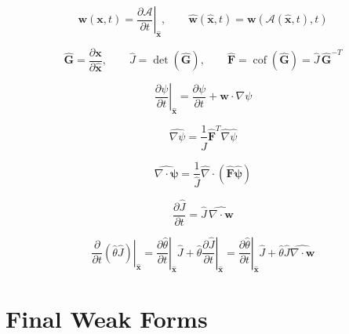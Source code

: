 \documentclass[11pt]{article}
\begin{document}
\begin{equation}
    \mathbf{w}(\mathbf{x},t) = \left.\frac{\partial \mathcal{A}}{\partial t}\right|_{\widehat{\mathbf{x}}}, \qquad
    \widehat{\mathbf{w}}(\widehat{\mathbf{x}},t) = \mathbf{w}(\mathcal{A}(\widehat{\mathbf{x}},t),t)
\end{equation}

\begin{equation}
    \widehat{\mathbf{G}} = \frac{\partial \mathbf{x}}{\partial \widehat{\mathbf{x}}}, \qquad
    \widehat{J} = \det\left( \widehat{\mathbf{G}} \right), \qquad
    \widehat{\mathbf{F}} = \operatorname{cof}\left( \widehat{\mathbf{G}} \right)
    = \widehat{J}\,\widehat{\mathbf{G}}^{-T}
\end{equation}

\begin{equation}
\left.\frac{\partial \psi}{\partial t}\right|_{\widehat{\mathbf{x}}} = \frac{\partial \psi}{\partial t} + \mathbf{w}\cdot\nabla \psi
\end{equation}

\begin{equation}
    \widehat{\nabla \psi} = \frac{1}{\widehat{J}} \widehat{\mathbf{F}}^{T} \widehat{\nabla} \widehat{\psi}
\end{equation}

\begin{equation}
    \widehat{\nabla \cdot \boldsymbol{\psi}} = \frac{1}{\widehat{J}} \widehat{\nabla} \cdot \left( \widehat{\mathbf{F}} \widehat{\boldsymbol{\psi}} \right)
\end{equation}

\begin{equation}
    \frac{\partial \widehat{J}}{\partial t} = \widehat{J}\, \widehat{\nabla \cdot \mathbf{w}}
\end{equation}

\begin{equation}
    \left. \frac{\partial}{\partial t} \left( \widehat{\theta} \widehat{J} \right) \right|_{\widehat{\mathbf{x}}}
    = \left. \frac{\partial \widehat{\theta}}{\partial t} \right|_{\widehat{\mathbf{x}}} \widehat{J}
    + \widehat{\theta} \left. \frac{\partial \widehat{J}}{\partial t} \right|_{\widehat{\mathbf{x}}}
    = \left. \frac{\partial \widehat{\theta}}{\partial t} \right|_{\widehat{\mathbf{x}}} \widehat{J}
    + \widehat{\theta} \widehat{J} \widehat{\nabla \cdot \mathbf{w}}
\end{equation}


\section{Final Weak Forms}
\end{document}
